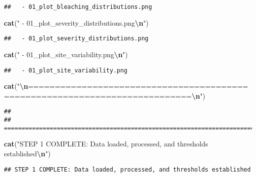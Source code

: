 \documentclass[
]{article}
\newenvironment{Shaded}{\begin{snugshade}}{\end{snugshade}}
\newcommand{\FunctionTok}[1]{\textcolor[rgb]{0.13,0.29,0.53}{\textbf{#1}}}
\newcommand{\NormalTok}[1]{#1}
\newcommand{\SpecialCharTok}[1]{\textcolor[rgb]{0.81,0.36,0.00}{\textbf{#1}}}
\newcommand{\StringTok}[1]{\textcolor[rgb]{0.31,0.60,0.02}{#1}}
\begin{document}
\begin{verbatim}
##   - 01_plot_bleaching_distributions.png
\end{verbatim}

\begin{Shaded}
\begin{Highlighting}[]
\FunctionTok{cat}\NormalTok{(}\StringTok{"  {-} 01\_plot\_severity\_distributions.png}\SpecialCharTok{\textbackslash{}n}\StringTok{"}\NormalTok{)}
\end{Highlighting}
\end{Shaded}

\begin{verbatim}
##   - 01_plot_severity_distributions.png
\end{verbatim}

\begin{Shaded}
\begin{Highlighting}[]
\FunctionTok{cat}\NormalTok{(}\StringTok{"  {-} 01\_plot\_site\_variability.png}\SpecialCharTok{\textbackslash{}n}\StringTok{"}\NormalTok{)}
\end{Highlighting}
\end{Shaded}

\begin{verbatim}
##   - 01_plot_site_variability.png
\end{verbatim}

\begin{Shaded}
\begin{Highlighting}[]
\FunctionTok{cat}\NormalTok{(}\StringTok{"}\SpecialCharTok{\textbackslash{}n}\StringTok{============================================================================}\SpecialCharTok{\textbackslash{}n}\StringTok{"}\NormalTok{)}
\end{Highlighting}
\end{Shaded}

\begin{verbatim}
## 
## ============================================================================
\end{verbatim}

\begin{Shaded}
\begin{Highlighting}[]
\FunctionTok{cat}\NormalTok{(}\StringTok{"STEP 1 COMPLETE: Data loaded, processed, and thresholds established}\SpecialCharTok{\textbackslash{}n}\StringTok{"}\NormalTok{)}
\end{Highlighting}
\end{Shaded}

\begin{verbatim}
## STEP 1 COMPLETE: Data loaded, processed, and thresholds established
\end{verbatim}
\end{document}
